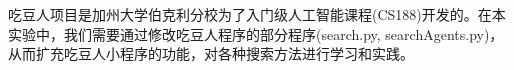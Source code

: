 

\begin{cnabstract}
  吃豆人项目是加州大学伯克利分校为了入门级人工智能课程(CS188)开发的。在本实验中，我们需要通过修改吃豆人程序的部分程序(search.py, searchAgents.py)，从而扩充吃豆人小程序的功能，对各种搜索方法进行学习和实践。

\end{cnabstract}
\par
\vspace*{2em}


